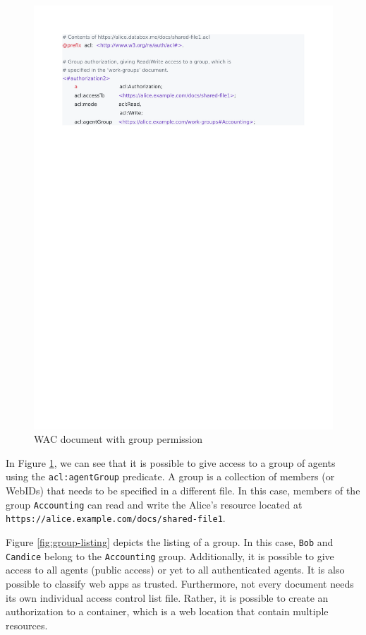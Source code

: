 \documentclass[sigconf]{acmart}
\def\code#1{\texttt{#1}}
\begin{document}
\begin{figure}
  \includegraphics[trim=2cm 21.2cm 4.7cm 2cm, clip, scale=0.57]{pdf/shared-file1}
  \caption{WAC document with group permission}
  \label{fig:group-permission}
\end{figure}

In Figure \ref{fig:group-permission}, we can see that it is possible to give access to a group of agents using the \code{acl:agentGroup} predicate. A group is a collection of members (or WebIDs) that needs to be specified in a different file. In this case, members of the group \code{Accounting} can read and write the Alice's resource located \linebreak at \code{https://alice.example.com\//docs/shared-file1}.

Figure \ref{fig:group-listing} depicts the listing of a group. In this case, \code{Bob} and \code{Candice} belong to the \code{Accounting} group. Additionally, it is possible to give access to all agents (public access) or yet to all authenticated agents. It is also possible to classify web apps as trusted. Furthermore, not every document needs its own individual access control list file. Rather, it is possible to create an authorization to a container, which is a web location that contain multiple resources.
\end{document}
